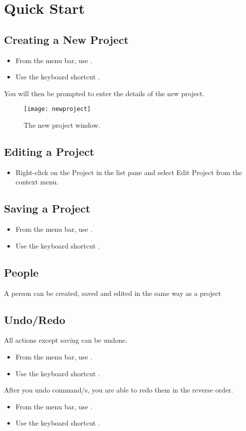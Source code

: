 \documentclass[11pt,fleqn]{book} %
\begin{document}
\section{Quick Start}

\subsection{Creating a New Project}
\begin{itemize}
  \item From the menu bar, use .
  \item Use the keyboard shortcut .
\end{itemize}
You will then be prompted to enter the details of the new project.

\begin{figure}[h]
  \centering
  \texttt{[image: newproject]}
  \caption{The new project window.\label{newproject}}
\end{figure}

\subsection{Editing a Project}
\begin{itemize}
  \item Right-click on the Project in the list pane and select Edit Project from the context menu.
\end{itemize}

\subsection{Saving a Project}
\begin{itemize}
  \item From the menu bar, use .
  \item Use the keyboard shortcut .
\end{itemize}

\subsection{People}
A person can be created, saved and edited in the same way as a project

\subsection{Undo/Redo}
All actions except saving can be undone.
\begin{itemize}
  \item From the menu bar, use .
  \item Use the keyboard shortcut .
\end{itemize}
After you undo command/s, you are able to redo them in the reverse order.
\begin{itemize}
  \item From the menu bar, use .
  \item Use the keyboard shortcut .
\end{itemize}
\end{document}
